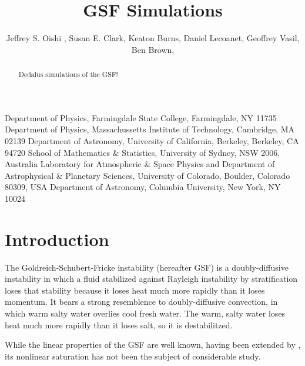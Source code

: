 \documentclass{jfm}
\begin{document}
\newtheorem{lemma}{Lemma}
\newtheorem{corollary}{Corollary}

\newcommand\Sch{\mbox{\textit{Sc}}} %

\title{GSF Simulations}

\author
 {
 Jeffrey S. Oishi
  ,
  Susan E. Clark,
  Keaton Burns,
  Daniel Lecoanet,
  Geoffrey Vasil,
  Ben Brown,
  }

\affiliation
{
Department of Physics, Farmingdale State College, Farmingdale, NY 11735
Department of Physics, Massachussetts Institute of Technology, Cambridge, MA 02139
Department of Astronomy, University of California, Berkeley, Berkeley, CA 94720
School of Mathematics \& Statistics, University of Sydney, NSW 2006, Australia
Laboratory for Atmospheric \& Space Physics and Department of Astrophysical \& Planetary Sciences, University of Colorado, Boulder, Colorado 80309, USA
Department of Astronomy, Columbia University, New York, NY 10024
}

\maketitle

\begin{abstract}
Dedalus simulations of the GSF!
\end{abstract}

\section{Introduction}
\label{sec:intro}
The Goldreich-Schubert-Fricke instability \citep{1967ApJ...150..571G}
(hereafter GSF) is a doubly-diffusive instability in which a fluid
stabilized against Rayleigh instability by stratification loses that
stability because it loses heat much more rapidly than it loses
momentum. It bears a strong resemblence to doubly-diffusive
convection, in which warm salty water overlies cool fresh water. The
warm, salty water loses heat much more rapidly than it loses salt, so
it is destabilitzed.

While the linear properties of the GSF are well known, having been
extended by \citet{1978RSPTA.289..459A}, its nonlinear saturation has
not been the subject of considerable study.
\end{document}
